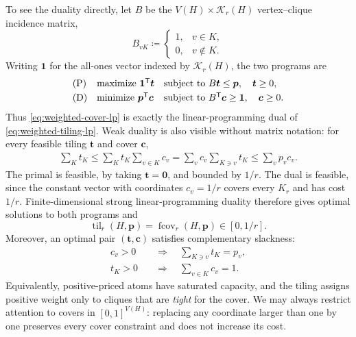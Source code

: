\documentclass[10pt]{article}
\numberwithin{equation}{section}
\newcommand{\til}{\operatorname{til}}
\newcommand{\fcov}{\operatorname{fcov}}
\newcommand{\one}{\mathbf 1}
\newcommand{\vct}[1]{\boldsymbol{#1}}
\begin{document}
To see the duality directly, let $B$ be the $V(H)\times\mathcal K_r(H)$ vertex--clique incidence matrix,
\[
 B_{vK}\coloneqq
 \begin{cases}
  1,&v\in K,\\
  0,&v\notin K.
 \end{cases}
\]
Writing $\one$ for the all-ones vector indexed by $\mathcal K_r(H)$, the two programs are
\[
 \begin{array}{lll}
 \text{\rm(P)}&
 \text{\rm maximize }\one^{\mathsf T}\vct t&
 \text{\rm subject to }B\vct t\le\vct p,\quad \vct t\ge0,\\[1mm]
 \text{\rm(D)}&
 \text{\rm minimize }\vct p^{\mathsf T}\vct c&
 \text{\rm subject to }B^{\mathsf T}\vct c\ge\one,\quad \vct c\ge0.
 \end{array}
\]
Thus \cref{eq:weighted-cover-lp} is exactly the linear-programming dual of \cref{eq:weighted-tiling-lp}.  Weak duality is also visible without matrix notation: for every feasible tiling $\vct t$ and cover $\vct c$,
\begin{equation}\label{eq:weighted-weak-duality}
\begin{aligned}
 \sum_Kt_K
 \le\sum_Kt_K\sum_{v\in K}c_v
 =\sum_vc_v\sum_{K\ni v}t_K
 \le\sum_vp_vc_v.
\end{aligned}
\end{equation}
The primal is feasible, by taking $\vct t=\vct0$, and bounded by $1/r$.  The dual is feasible, since the constant vector with coordinates $c_v=1/r$ covers every $K_r$ and has cost $1/r$.  Finite-dimensional strong linear-programming duality therefore gives optimal solutions to both programs and
\begin{equation}\label{eq:weighted-duality}
 \til_r(H,\vct p)=\fcov_r(H,\vct p)\in[0,1/r].
\end{equation}
Moreover, an optimal pair $(\vct t,\vct c)$ satisfies complementary slackness:
\begin{equation}\label{eq:weighted-complementary-slackness}
\begin{aligned}
 c_v>0
 &\quad\Longrightarrow\quad
   \sum_{K\ni v}t_K=p_v,\\
 t_K>0
 &\quad\Longrightarrow\quad
   \sum_{v\in K}c_v=1.
\end{aligned}
\end{equation}
Equivalently, positive-priced atoms have saturated capacity, and the tiling assigns positive weight only to cliques that are \emph{tight} for the cover.  We may always restrict attention to covers in $[0,1]^{V(H)}$: replacing any coordinate larger than one by one preserves every cover constraint and does not increase its cost.
\end{document}
